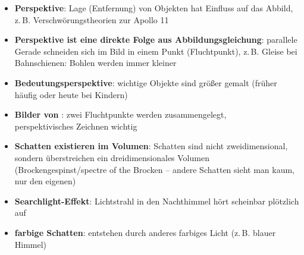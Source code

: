 \linie
\begin{itemize}
    \item
    \textbf{Perspektive}:
    Lage (Entfernung) von Objekten hat Einfluss auf das Abbild, z.\,B.
    Verschwörungstheorien zur Apollo 11
    
    \item
    \textbf{Perspektive ist eine direkte Folge aus Abbildungsgleichung}:
    parallele Gerade schneiden sich im Bild in einem Punkt (Fluchtpunkt),
    z.\,B. Gleise bei Bahnschienen: Bohlen werden immer kleiner
    
    \item
    \textbf{Bedeutungsperspektive}:
    wichtige Objekte sind größer gemalt (früher häufig oder heute bei Kindern)
    
    \item
    \textbf{Bilder von }: zwei Fluchtpunkte werden
    zusammengelegt, \\
    perspektivisches Zeichnen wichtig
    
    \item
    \textbf{Schatten existieren im Volumen}:
    Schatten sind nicht zweidimensional, sondern überstreichen
    ein dreidimensionales Volumen (Brockengespinst/spectre of the Brocken --
    andere Schatten sieht man kaum, nur den eigenen)
    
    \item
    \textbf{Searchlight-Effekt}:
    Lichtstrahl in den Nachthimmel hört scheinbar plötzlich auf
    
    \item
    \textbf{farbige Schatten}:
    entstehen durch anderes farbiges Licht (z.\,B. blauer Himmel)
\end{itemize}

\pagebreak
